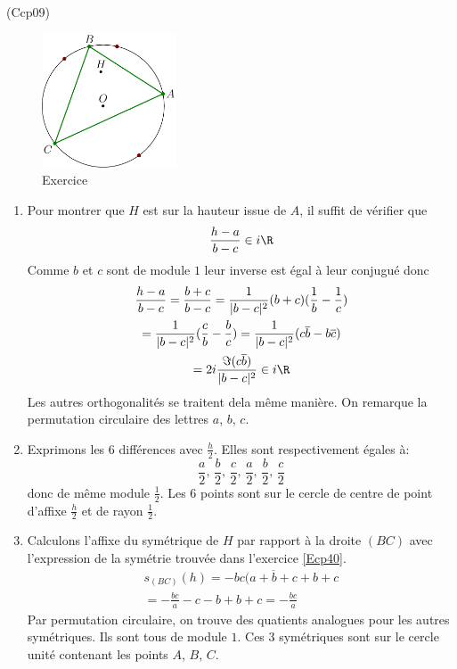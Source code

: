 \begin{tiny}(Ccp09)\end{tiny}
\begin{figure}[h]
 \centering
 \includegraphics[width=4cm]{./Ccp09_1.pdf}
 \caption{Exercice }
 \label{fig:Ccp09_1}
\end{figure}

\begin{enumerate}
 \item Pour montrer que $H$ est sur la hauteur issue de $A$, il suffit de vérifier que 
\begin{displaymath}
 \frac{h -a}{b-c} \in i\R
\end{displaymath}
Comme $b$ et $c$ sont de module $1$ leur inverse est égal à leur conjugué donc
\begin{multline*}
 \frac{h -a}{b-c} = \frac{b+c}{b-c}
 = \frac{1}{|b-c|^2}(b+c)(\frac{1}{b}-\frac{1}{c})\\
 = \frac{1}{|b-c|^2}(\frac{c}{b}-\frac{b}{c})
 = \frac{1}{|b-c|^2}(c\overline{b}-b\overline{c})\\
 = 2i \frac{\Im(c\overline{b})}{|b-c|^2}\in i\R
\end{multline*}
Les autres orthogonalités se traitent dela même manière. On remarque la permutation circulaire des lettres $a$, $b$, $c$.

 \item Exprimons les 6 différences avec $\frac{h}{2}$. Elles sont respectivement égales à:
\begin{displaymath}
 \frac{a}{2},\,\frac{b}{2},\,\frac{c}{2},\,\frac{a}{2},\,\frac{b}{2},\,\frac{c}{2}   
\end{displaymath}
donc de même module $\frac{1}{2}$. Les 6 points sont sur le cercle de centre de point d'affixe $\frac{h}{2}$ et de rayon $\frac{1}{2}$.
 
 
 \item Calculons l'affixe du symétrique de $H$ par rapport à la droite $(BC)$ avec l'expression de la symétrie trouvée dans l'exercice \ref{Ecp40}.
\begin{multline*}
 s_{(BC)}(h) = -bc(\overline{a+b+c}+b+c\\
 = -\frac{bc}{a} -c -b + b + c = -\frac{bc}{a} 
\end{multline*}
Par permutation circulaire, on trouve des quatients analogues pour les autres symétriques. Ils sont tous de module $1$. Ces 3 symétriques sont sur le cercle unité contenant les points $A$, $B$, $C$.
\end{enumerate}
